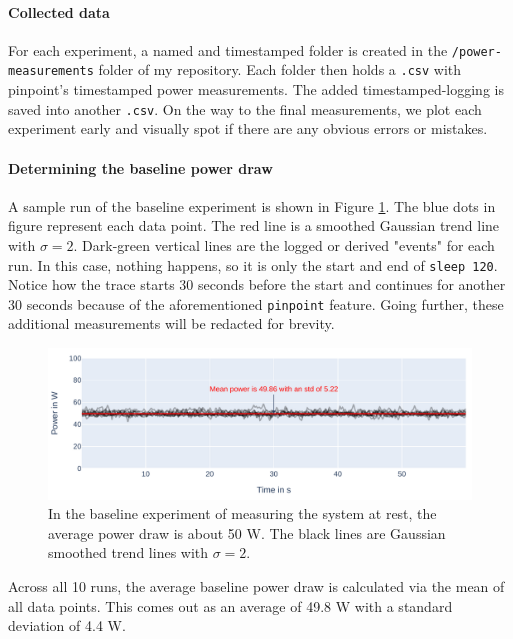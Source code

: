 \paragraph{Collected data}

For each experiment, a named and timestamped folder is created in the \verb|/power-measurements| folder of my repository. Each folder then holds a \verb|.csv| with pinpoint's timestamped power measurements. 
The added timestamped-logging is saved into another \verb|.csv|. 
On the way to the final measurements, we plot each experiment early and visually spot if there are any obvious errors or mistakes.

\paragraph{Determining the baseline power draw}

A sample run of the baseline experiment is shown in Figure \ref{fig:plot_baseline}.
The blue dots in figure represent each data point. The red line is a smoothed Gaussian trend line with $\sigma = 2$. 
Dark-green vertical lines are the logged or derived "events" for each run. In this case, nothing happens, so it is only the start and end of \verb|sleep 120|. 
Notice how the trace starts 30 seconds before the start and continues for another 30 seconds because of the aforementioned \verb|pinpoint| feature.
Going further, these additional measurements will be redacted for brevity.

\begin{figure}
    \includegraphics[width=\linewidth]{power-measurements/stacked_plots/sleep_0714.pdf}
    \caption{In the baseline experiment of measuring the system at rest, the average power draw is about 50 W. The black lines are Gaussian smoothed trend lines with $\sigma = 2$.}
    \label{fig:plot_baseline}
\end{figure}

Across all 10 runs, the average baseline power draw is calculated via the mean of all data points. This comes out as an average of 49.8 W with a standard deviation of 4.4 W.

